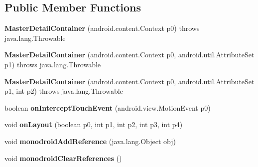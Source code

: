 \subsection*{Public Member Functions}
\begin{DoxyCompactItemize}
\item 
\mbox{\label{classmd5b60ffeb829f638581ab2bb9b1a7f4f3f_1_1MasterDetailContainer_a1af6b6d44bea0fd2817369e2e442b274}} 
{\bfseries Master\+Detail\+Container} (android.\+content.\+Context p0)  throws java.\+lang.\+Throwable 	
\item 
\mbox{\label{classmd5b60ffeb829f638581ab2bb9b1a7f4f3f_1_1MasterDetailContainer_ac9b0445081c2aabb67adc98d6b8c9ca1}} 
{\bfseries Master\+Detail\+Container} (android.\+content.\+Context p0, android.\+util.\+Attribute\+Set p1)  throws java.\+lang.\+Throwable 	
\item 
\mbox{\label{classmd5b60ffeb829f638581ab2bb9b1a7f4f3f_1_1MasterDetailContainer_a3e752c4a1c463a622ff8574921b3c763}} 
{\bfseries Master\+Detail\+Container} (android.\+content.\+Context p0, android.\+util.\+Attribute\+Set p1, int p2)  throws java.\+lang.\+Throwable 	
\item 
\mbox{\label{classmd5b60ffeb829f638581ab2bb9b1a7f4f3f_1_1MasterDetailContainer_ae96ebc11fc79fa8ff77d7106dac3971a}} 
boolean {\bfseries on\+Intercept\+Touch\+Event} (android.\+view.\+Motion\+Event p0)
\item 
\mbox{\label{classmd5b60ffeb829f638581ab2bb9b1a7f4f3f_1_1MasterDetailContainer_a0ef2e1e3ab4836b6a210d6af09d780c6}} 
void {\bfseries on\+Layout} (boolean p0, int p1, int p2, int p3, int p4)
\item 
\mbox{\label{classmd5b60ffeb829f638581ab2bb9b1a7f4f3f_1_1MasterDetailContainer_a5f8aaba34799a0323fa0d77618dfae96}} 
void {\bfseries monodroid\+Add\+Reference} (java.\+lang.\+Object obj)
\item 
\mbox{\label{classmd5b60ffeb829f638581ab2bb9b1a7f4f3f_1_1MasterDetailContainer_a4bbf2f5847044e80a0b1b8e54eb8f621}} 
void {\bfseries monodroid\+Clear\+References} ()
\end{DoxyCompactItemize}
